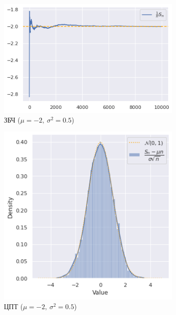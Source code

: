 	\begin{figure}[tbp]
        \centering
        \begin{subfigure}[b]{0.45\textwidth}
            \centering
            \includegraphics[width=\textwidth]{resources/task5_LLN.png}
            \caption{ЗБЧ ($\mu = -2,\:\sigma^2 = 0.5$)}
            \label{LLN}
        \end{subfigure}
        \hfill
        \begin{subfigure}[b]{0.5\textwidth}
            \centering
            \includegraphics[width=\textwidth]{resources/task5_CLT.png}
            \caption{ЦПТ ($\mu = -2,\:\sigma^2 = 0.5$)}
            \label{CLT}
        \end{subfigure}
        \caption{}
    \end{figure}
	
